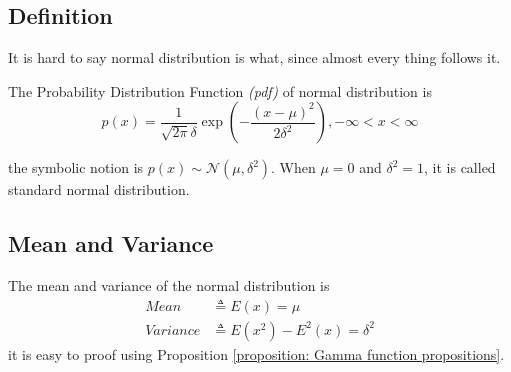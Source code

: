 \documentclass[../main.tex]{subfiles}
\begin{document}
\subsection{Definition}

It is hard to say normal distribution is what, since almost every thing follows it.

The Probability Distribution Function \emph{(pdf)} of normal distribution is
\begin{equation}
    p(x) = \frac{1}{\sqrt{2\pi}\delta} \exp({-\frac{(x-\mu)^2}{2\delta^2}}), -\infty < x < \infty
\end{equation}

the symbolic notion is $p(x) \sim \mathcal{N}(\mu, \delta^2)$.
When $\mu = 0$ and $\delta^2 = 1$, it is called standard normal distribution.

\subsection{Mean and Variance}

The mean and variance of the normal distribution is
\begin{align*}
    Mean     & \triangleq E(x) = \mu                 \\
    Variance & \triangleq E(x^2) - E^2(x) = \delta^2
\end{align*}
it is easy to proof using Proposition \ref{proposition: Gamma function propositions}.
\end{document}
